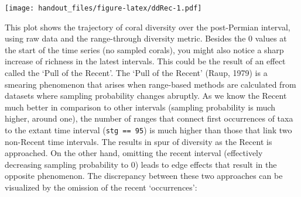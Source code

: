 \documentclass[]{article}
\newenvironment{Shaded}{\begin{snugshade}}{\end{snugshade}}
\newcommand{\KeywordTok}[1]{\textcolor[rgb]{0.13,0.29,0.53}{\textbf{{#1}}}}
\newcommand{\DataTypeTok}[1]{\textcolor[rgb]{0.13,0.29,0.53}{{#1}}}
\newcommand{\DecValTok}[1]{\textcolor[rgb]{0.00,0.00,0.81}{{#1}}}
\newcommand{\StringTok}[1]{\textcolor[rgb]{0.31,0.60,0.02}{{#1}}}
\newcommand{\CommentTok}[1]{\textcolor[rgb]{0.56,0.35,0.01}{\textit{{#1}}}}
\newcommand{\NormalTok}[1]{{#1}}
\begin{document}
\texttt{[image: handout\_files/figure-latex/ddRec-1.pdf]}

This plot shows the trajectory of coral diversity over the post-Permian
interval, using raw data and the range-through diversity metric. Besides
the 0 values at the start of the time series (no sampled corals), you
might also notice a sharp increase of richness in the latest intervals.
This could be the result of an effect called the `Pull of the Recent'.
The `Pull of the Recent' (Raup, 1979) is a smearing phenomenon that
arises when range-based methods are calculated from datasets where
sampling probability changes abruptly. As we know the Recent much better
in comparison to other intervals (sampling probability is much higher,
around one), the number of ranges that connect first occurrences of taxa
to the extant time interval (\texttt{stg\ ==\ 95}) is much higher than
those that link two non-Recent time intervals. The results in spur of
diversity as the Recent is approached. On the other hand, omitting the
recent interval (effectively decreasing sampling probability to 0) leads
to edge effects that result in the opposite phenomenon. The discrepancy
between these two approaches can be visualized by the omission of the
recent `occurrences':

\begin{Shaded}
\end{Shaded}
\end{document}

